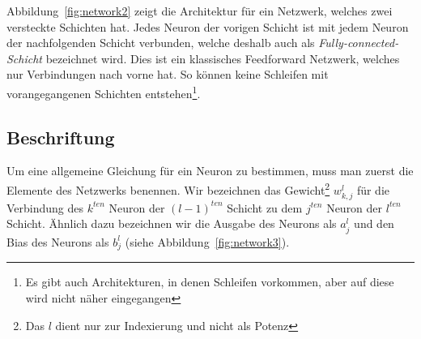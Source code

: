 \documentclass[12pt,a4paper]{report}
\begin{document}
Abbildung~\ref{fig:network2} zeigt die Architektur für ein Netzwerk, welches zwei versteckte Schichten hat.
Jedes Neuron der vorigen Schicht ist mit jedem Neuron der nachfolgenden Schicht verbunden,
welche deshalb auch als \textit{Fully-connected-Schicht} bezeichnet wird.
Dies ist ein klassisches Feedforward Netzwerk,
welches nur Verbindungen nach vorne hat. So können keine Schleifen mit vorangegangenen Schichten entstehen\footnote{Es gibt auch Architekturen, in denen Schleifen vorkommen,
aber auf diese wird nicht näher eingegangen}.

\subsection{Beschriftung}

Um eine allgemeine Gleichung für ein Neuron zu bestimmen, muss man zuerst die Elemente des Netzwerks benennen.
Wir bezeichnen das Gewicht\footnote{Das $l$ dient nur zur Indexierung und nicht als Potenz} $w^l_{k,j}$ für die Verbindung des $k^{ten}$ Neuron der $(l-1)^{ten}$ Schicht
zu dem $j^{ten}$ Neuron der $l^{ten}$ Schicht.
Ähnlich dazu bezeichnen wir die Ausgabe des Neurons als $a^l_j$ und den Bias des Neurons als $b^l_j$ (siehe Abbildung~\ref{fig:network3}).
\end{document}
